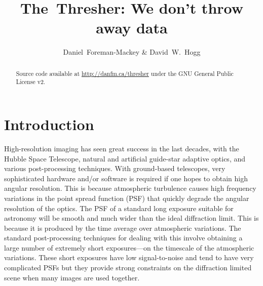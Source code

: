 \documentclass[12pt,preprint]{aastex}
\newcommand{\project}[1]{{\sffamily #1}}
\newcommand{\TheThresher}{\project{The~Thresher}}
\newcommand{\license}{GNU General Public License v2}
\begin{document}
\title{\TheThresher: We don't throw away data}

\author{%
    Daniel~Foreman-Mackey\altaffilmark{\ref{CCPP},\ref{email}} \&
    David~W.~Hogg\altaffilmark{\ref{CCPP},\ref{MPIA}}
}

\setcounter{address}{1}

\begin{abstract}
    Source code available at \url{http://danfm.ca/thresher}
    under the \license.
\end{abstract}


\clearpage

\section{Introduction}

High-resolution imaging has seen great success in the last decades,
with the \project{Hubble Space Telescope}, natural and artificial
guide-star adaptive optics, and various post-processing techniques.
With ground-based telescopes, very sophisticated hardware and/or
software is required if one hopes to obtain high angular resolution.
This is because atmospheric turbulence causes high frequency variations
in the point spread function (PSF) that quickly degrade the angular
resolution of the optics. The PSF of a standard long exposure suitable
for astronomy will be smooth and much wider than the ideal diffraction
limit. This is because it is produced by the time average over
atmospheric variations. The standard post-processing techniques for
dealing with this involve obtaining a large number of extremely short
exposures---on the timescale of the atmospheric variations. These
short exposures have low signal-to-noise and tend to have very
complicated PSFs but they provide strong constraints on the
diffraction limited scene when many images are used together.
\end{document}
